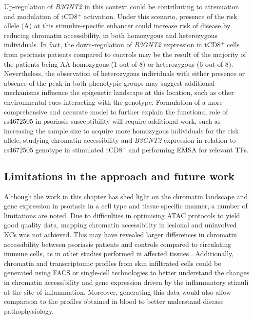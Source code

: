 Up-regulation of \textit{B3GNT2} in this context could be contributing to attenuation and modulation of tCD8$^+$ activation. Under this scenario, presence of the risk allele (A) at this stimulus-specific enhancer could increase risk of disease by reducing chromatin accessibility, in both homozygous and heterozygous individuals. In fact, the down-regulation of \textit{B3GNT2} expression in tCD8$^+$ cells from psoriasis patients compared to controls may be the result of the majority of the patients being AA homozygous (1 out of 8) or heterozygous (6 out of 8).  Nevertheless, the observation of heterozygous individuals with either presence or absence of the peak in both phenotypic groups may suggest additional mechanisms influence the epigenetic landscape at this location, such as other environmental cues interacting with the genotype. Formulation of a more comprehensive and accurate model to further explain the functional role of rs4672505 in psoriasis susceptibility will require additional work, such as increasing the sample size to acquire more homozygous individuals for the risk allele, studying chromatin accessibility and \textit{B3GNT2} expression in relation to rs4672505 genotype in stimulated tCD8$^+$ and performing EMSA for relevant TFs.


\subsection{Limitations in the approach and future work}
Although the work in this chapter has shed light on the chromatin landscape and gene expression in psoriasis in a cell type and tissue specific manner, a number of limitations are noted.  Due to difficulties in optimising ATAC protocols to yield good quality data, mapping chromatin accessibility in lesional and uninvolved KCs was not achieved. This may have revealed larger differences in chromatin accessibility between psoriasis patients and controls compared to circulating immune cells, as in other studies performed in affected tissues \parencite{Scharer2016, Wang2018}. Additionally, chromatin and transcriptomic profiles from skin infiltrated cells could be generated using FACS or single-cell technologies to better understand the changes in chromatin accessibility and gene expression driven by the inflammatory stimuli at the site of inflammation. Moreover, generating this data would also allow comparison to the profiles obtained in blood to better understand disease pathophysiology. 

